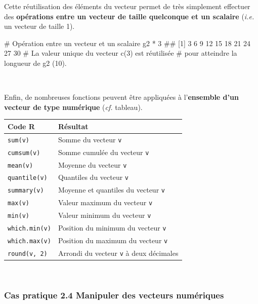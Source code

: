 \documentclass[12pt,twosided, notitlepage]{book}
\newenvironment{Shaded}{}{}
\newcommand{\CommentTok}[1]{\textcolor[rgb]{0.00,0.50,0.00}{#1}}
\newcommand{\DecValTok}[1]{#1}
\newcommand{\NormalTok}[1]{#1}
\newcommand{\OperatorTok}[1]{#1}
\newcommand{\StringTok}[1]{\textcolor[rgb]{0.00,0.50,0.50}{#1}}
\renewenvironment{Shaded}{\begin{snugshade}}{\end{snugshade}}
\begin{document}
Cette réutilisation des éléments du vecteur permet de très simplement
effectuer des \textbf{opérations entre un vecteur de taille quelconque
et un scalaire} (\emph{i.e.} un vecteur de taille 1).

\begin{Shaded}
\begin{Highlighting}[]
\CommentTok{# Opération entre un vecteur et un scalaire}
\NormalTok{g2 }\OperatorTok{*}\StringTok{ }\DecValTok{3}
\NormalTok{  ##  [1]  3  6  9 12 15 18 21 24 27 30}
\CommentTok{# La valeur unique du vecteur c(3) est réutilisée}
\CommentTok{# pour atteindre la longueur de g2 (10). }
\end{Highlighting}
\end{Shaded}

~

Enfin, de nombreuses fonctions peuvent être appliquées à
l'\textbf{ensemble d'un vecteur de type numérique} (\emph{cf.} tableau).

\begin{longtable}[]{@{}ll@{}}
\toprule
\textbf{Code R} & \textbf{Résultat}\tabularnewline
\midrule
\endhead
\texttt{sum(v)}\index{\texttt{sum}|textbf} & Somme du vecteur
\texttt{v}\tabularnewline
\texttt{cumsum(v)}\index{\texttt{cumsum}|textbf} & Somme cumulée du
vecteur \texttt{v}\tabularnewline
\texttt{mean(v)}\index{\texttt{mean}|textbf} & Moyenne du vecteur
\texttt{v}\tabularnewline
\texttt{quantile(v)}\index{\texttt{quantile}|textbf} & Quantiles du
vecteur \texttt{v}\tabularnewline
\texttt{summary(v)}\index{\texttt{summary}|textbf} & Moyenne et
quantiles du vecteur \texttt{v}\tabularnewline
\texttt{max(v)}\index{\texttt{max}|textbf} & Valeur maximum du vecteur
\texttt{v}\tabularnewline
\texttt{min(v)}\index{\texttt{min}|textbf} & Valeur minimum du vecteur
\texttt{v}\tabularnewline
\texttt{which.min(v)}\index{\texttt{which.min}|textbf} & Position du
minimum du vecteur \texttt{v}\tabularnewline
\texttt{which.max(v)}\index{\texttt{which.max}|textbf} & Position du
maximum du vecteur \texttt{v}\tabularnewline
\texttt{round(v,\ 2)}\index{\texttt{round}|textbf} & Arrondi du vecteur
\texttt{v} à deux décimales\tabularnewline
\bottomrule
\end{longtable}

~

\hypertarget{cas-pratique-2.4-manipuler-des-vecteurs-numeriques}{%
\subsubsection{\texorpdfstring{\textbf{Cas pratique 2.4} Manipuler des
vecteurs
numériques}{Cas pratique 2.4 Manipuler des vecteurs numériques}}\label{cas-pratique-2.4-manipuler-des-vecteurs-numeriques}}
\end{document}
